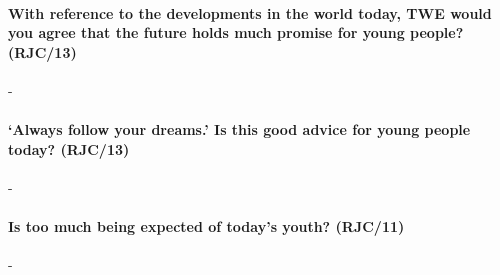 \documentclass[../../main]{subfiles}
\begin{document}
\paragraph{With reference to the developments in the world today, TWE would you agree that the future holds much promise for young people? (RJC/13)}-

\paragraph{`Always follow your dreams.' Is this good advice for young people today? (RJC/13)}-

\paragraph{Is too much being expected of today's youth? (RJC/11)}-
\end{document}
